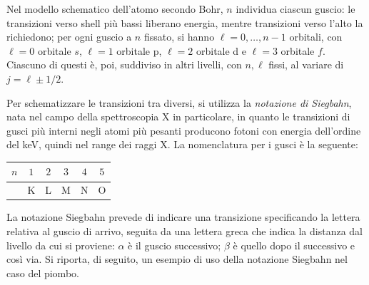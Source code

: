\documentclass[11pt, a4paper]{scrartcl}
\theoremstyle{style}
\theoremstyle{style1}
\numberwithin{equation}{subsection}
\begin{document}
Nel modello schematico dell'atomo secondo Bohr, $n$ individua ciascun guscio: le transizioni verso shell pi\`u bassi liberano energia, mentre transizioni verso l'alto la richiedono; per ogni guscio a $n$ fissato, si hanno $\ell =0 ,\ldots,n-1$ orbitali, con $\ell =0$ orbitale $s$, $\ell = 1$ orbitale p, $\ell =2$ orbitale d e $\ell =3$ orbitale $f$.
Ciascuno di questi \`e, poi, suddiviso in altri livelli, con $n,\ell $ fissi, al variare di $j = \ell  \pm 1/2$.

Per schematizzare le transizioni tra diversi, si utilizza la \textit{notazione di Siegbahn}, nata nel campo della spettroscopia X in particolare, in quanto le transizioni di gusci pi\`u interni negli atomi pi\`u pesanti producono fotoni con energia dell'ordine del keV, quindi nel range dei raggi X.
La nomenclatura per i gusci \`e la seguente:
\begin{table}[h!]
	\centering
	\begin{tabular}{c | c c c c c}
		$n$& $1$ & $2$ & $3$ & $4$ & $5$\\
	\hline
		   & K & L & M & N & O\\
	\end{tabular}
\end{table}
La notazione Siegbahn prevede di indicare una transizione specificando la lettera relativa al guscio di arrivo, seguita da una lettera greca che indica la distanza dal livello da cui si proviene: $\alpha $ \`e il guscio successivo; $\beta $ \`e quello dopo il successivo e cos\`i via.
Si riporta, di seguito, un esempio di uso della notazione Siegbahn nel caso del piombo. 
\end{document}
